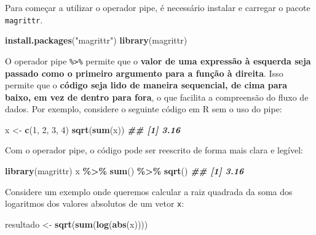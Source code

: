 \documentclass[
]{book}
\newenvironment{Shaded}{\begin{snugshade}}{\end{snugshade}}
\newcommand{\DecValTok}[1]{\textcolor[rgb]{0.00,0.00,0.81}{#1}}
\newcommand{\DocumentationTok}[1]{\textcolor[rgb]{0.56,0.35,0.01}{\textbf{\textit{#1}}}}
\newcommand{\FunctionTok}[1]{\textcolor[rgb]{0.13,0.29,0.53}{\textbf{#1}}}
\newcommand{\NormalTok}[1]{#1}
\newcommand{\OtherTok}[1]{\textcolor[rgb]{0.56,0.35,0.01}{#1}}
\newcommand{\SpecialCharTok}[1]{\textcolor[rgb]{0.81,0.36,0.00}{\textbf{#1}}}
\newcommand{\StringTok}[1]{\textcolor[rgb]{0.31,0.60,0.02}{#1}}
\begin{document}
Para começar a utilizar o operador pipe, é necessário instalar e
carregar o pacote \texttt{magrittr}.

\begin{Shaded}
\begin{Highlighting}[]
\FunctionTok{install.packages}\NormalTok{(}\StringTok{"magrittr"}\NormalTok{)}
\FunctionTok{library}\NormalTok{(magrittr)}
\end{Highlighting}
\end{Shaded}

O operador pipe \texttt{\%\textgreater{}\%} permite que o \textbf{valor de uma expressão à esquerda seja passado como o primeiro argumento para a função à direita}. Isso permite que o \textbf{código seja lido de maneira sequencial, de cima para baixo, em vez de dentro para fora}, o que facilita a compreensão do fluxo de dados. Por exemplo, considere o seguinte código em R sem o uso do pipe:

\begin{Shaded}
\begin{Highlighting}[]
\NormalTok{x }\OtherTok{\textless{}{-}} \FunctionTok{c}\NormalTok{(}\DecValTok{1}\NormalTok{, }\DecValTok{2}\NormalTok{, }\DecValTok{3}\NormalTok{, }\DecValTok{4}\NormalTok{)}
\FunctionTok{sqrt}\NormalTok{(}\FunctionTok{sum}\NormalTok{(x))}
\DocumentationTok{\#\# [1] 3.16}
\end{Highlighting}
\end{Shaded}

Com o operador pipe, o código pode ser reescrito de forma mais clara e
legível:

\begin{Shaded}
\begin{Highlighting}[]
\FunctionTok{library}\NormalTok{(magrittr)}
\NormalTok{x }\SpecialCharTok{\%\textgreater{}\%} \FunctionTok{sum}\NormalTok{() }\SpecialCharTok{\%\textgreater{}\%} \FunctionTok{sqrt}\NormalTok{()}
\DocumentationTok{\#\# [1] 3.16}
\end{Highlighting}
\end{Shaded}

Considere um exemplo onde queremos calcular a raiz quadrada da soma dos
logaritmos dos valores absolutos de um vetor \texttt{x}:

\begin{Shaded}
\begin{Highlighting}[]
\NormalTok{resultado }\OtherTok{\textless{}{-}} \FunctionTok{sqrt}\NormalTok{(}\FunctionTok{sum}\NormalTok{(}\FunctionTok{log}\NormalTok{(}\FunctionTok{abs}\NormalTok{(x))))}
\end{Highlighting}
\end{Shaded}
\end{document}
